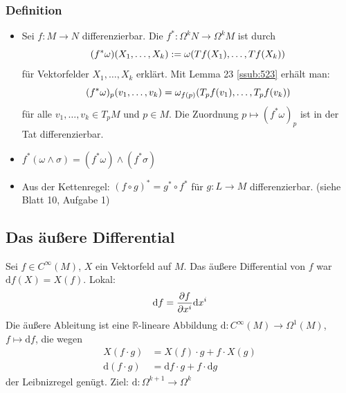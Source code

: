 \subsubsection[Definition: Induzierte Abbildung]{Definition} %
\label{ssub:524}
\begin{itemize}
	\item Sei $f : M \to N$ differenzierbar. Die   $f^* : \Omega^k N \to \Omega^k M$ ist durch
	\[
		\enbrace*{f^* \omega} \enbrace*{X_1, \ldots , X_k} := \omega \enbrace*{T f(X_1), \ldots , T f (X_k)}   
	\]
	für Vektorfelder $X_1, \ldots , X_k$ erklärt.
	Mit Lemma 23 \ref{ssub:523} erhält man:
	\[
		(f^* \omega)_p (v_1, \ldots , v_k) = \omega_{f(p)} \enbrace*{T_p f(v_1), \ldots , T_p f (v_k)} 
	\]
	für alle $v_1, \ldots , v_k \in T_p M$ und $p \in M$. Die Zuordnung $p \mapsto (f^* \omega)_p$ ist in der Tat differenzierbar.
	\item $f^*(\omega \wedge \sigma) = (f^* \omega) \wedge (f^* \sigma)$
	\item Aus der Kettenregel: $(f \circ g)^* = g^* \circ  f^*$ für $g : L \to M$ differenzierbar. \hfill(siehe Blatt 10, Aufgabe 1)
\end{itemize}

\subsection{Das äußere Differential} %
\label{sub:53}
Sei $f \in C^\infty(M)$, $X$ ein Vektorfeld auf $M$. Das äußere Differential von $f$ war $\mathrm{d}f(X) = X(f)$. Lokal:
\[
	\mathrm{d}f = \frac{{\partial f}}{{\partial x^i}}  \mathrm{d}x^i 
\]
Die äußere Ableitung ist eine $\mathds{R}$-lineare Abbildung $\mathrm{d} : C^\infty(M) \to \Omega^1(M)$, $f \mapsto \mathrm{d}f$, die wegen 
\begin{align*}
	X(f \cdot g) &= X(f) \cdot g + f \cdot X(g) \\
	\mathrm{d}(f \cdot g) &= \mathrm{d}f \cdot g + f \cdot \mathrm{d} g
\end{align*}
der Leibnizregel genügt. Ziel: $\mathrm{d} : \Omega^{k+1} \to \Omega^k$

